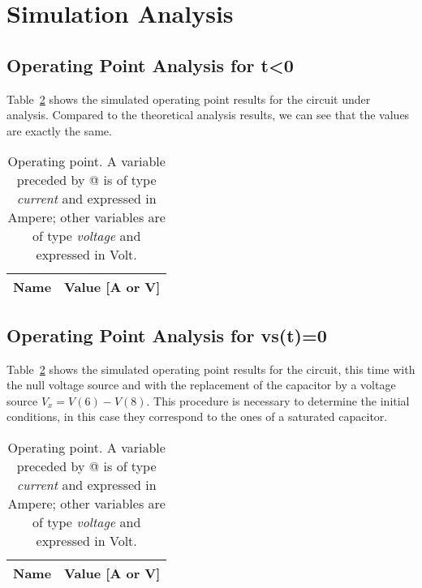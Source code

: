 \section{Simulation Analysis}
\label{sec:simulation}


\subsection{Operating Point Analysis for t\textless0}

Table~\ref{tab:op} shows the simulated operating point results for the circuit
under analysis. Compared to the theoretical analysis results, we can see that the values are exactly the same.

\begin{table}[h]
  \centering
  \begin{tabular}{|l|r|}
    \hline    
    {\bf Name} & {\bf Value [A or V]} \\ \hline
    
  \end{tabular}
  \caption{Operating point. A variable preceded by @ is of type {\em current}
    and expressed in Ampere; other variables are of type {\it voltage} and expressed in
    Volt.}
  \label{tab:op}
\end{table}



\subsection{Operating Point Analysis for vs(t)=0}

Table~\ref{tab:op} shows the simulated operating point results for the circuit, this time with the null voltage source and with the replacement of the capacitor by a voltage source $V_x=V(6)-V(8)$. This procedure is necessary to determine the initial conditions, in this case they correspond to the ones of a saturated capacitor. 

\begin{table}[h]
  \centering
  \begin{tabular}{|l|r|}
    \hline    
    {\bf Name} & {\bf Value [A or V]} \\ \hline
    
  \end{tabular}
  \caption{Operating point. A variable preceded by @ is of type {\em current}
    and expressed in Ampere; other variables are of type {\it voltage} and expressed in
    Volt.}
  \label{tab:op}
\end{table}





